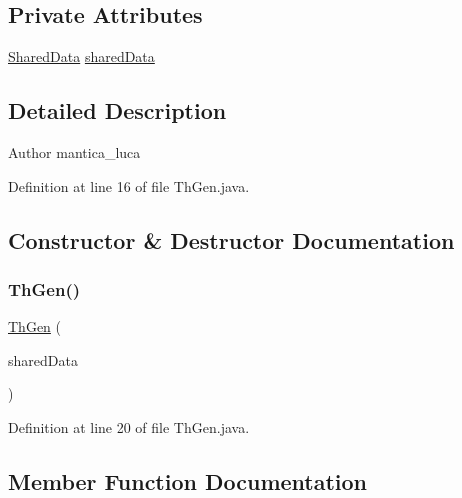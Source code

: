 \subsection*{Private Attributes}
\begin{DoxyCompactItemize}
\item 
\mbox{\hyperlink{classmain_1_1_shared_data}{Shared\+Data}} \mbox{\hyperlink{classmain_1_1_th_gen_a1cc1b8edddc4a6929213d3387b370bcd}{shared\+Data}}
\end{DoxyCompactItemize}


\subsection{Detailed Description}
\begin{DoxyAuthor}{Author}
mantica\+\_\+luca 
\end{DoxyAuthor}


Definition at line 16 of file Th\+Gen.\+java.



\subsection{Constructor \& Destructor Documentation}
\mbox{\label{classmain_1_1_th_gen_ab975ff8819d4ba6b00d6661950d14bb6}} 
\subsubsection{\texorpdfstring{Th\+Gen()}{ThGen()}}
{\footnotesize\ttfamily \mbox{\hyperlink{classmain_1_1_th_gen}{Th\+Gen}} (\begin{DoxyParamCaption}\item[{\mbox{\hyperlink{classmain_1_1_shared_data}{Shared\+Data}}}]{shared\+Data }\end{DoxyParamCaption})}



Definition at line 20 of file Th\+Gen.\+java.



\subsection{Member Function Documentation}
\mbox{\label{classmain_1_1_th_gen_a13a43e6d814de94978c515cb084873b1}} 
